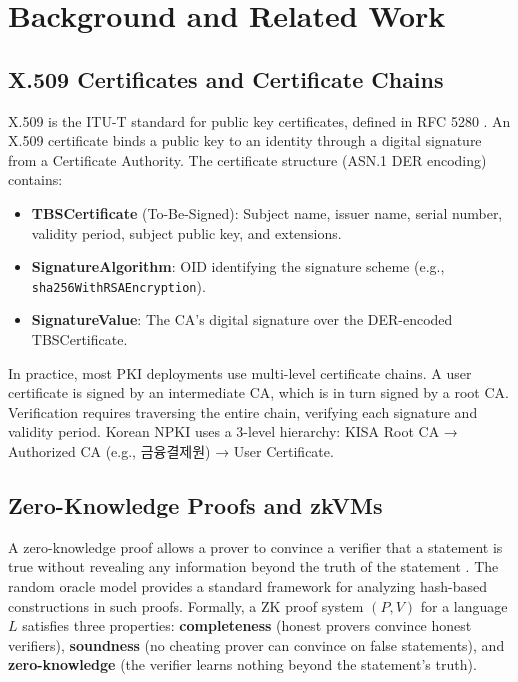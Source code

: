 \documentclass[11pt, a4paper]{article}
\providecommand{\tightlist}{%
  \setlength{\itemsep}{0pt}\setlength{\parskip}{0pt}}
\begin{document}
\section{Background and Related
Work}\label{background-and-related-work}

\subsection{X.509 Certificates and Certificate
Chains}\label{x.509-certificates-and-certificate-chains}

X.509 is the ITU-T standard for public key certificates, defined in RFC
5280 \cite{ref4}. An X.509 certificate binds a public key to an identity
through a digital signature from a Certificate Authority. The
certificate structure (ASN.1 DER encoding) contains:

\begin{itemize}
\tightlist
\item
  \textbf{TBSCertificate} (To-Be-Signed): Subject name, issuer name,
  serial number, validity period, subject public key, and extensions.
\item
  \textbf{SignatureAlgorithm}: OID identifying the signature scheme
  (e.g., \texttt{sha256WithRSAEncryption}).
\item
  \textbf{SignatureValue}: The CA's digital signature over the
  DER-encoded TBSCertificate.
\end{itemize}

In practice, most PKI deployments use multi-level certificate chains. A
user certificate is signed by an intermediate CA, which is in turn
signed by a root CA. Verification requires traversing the entire chain,
verifying each signature and validity period. Korean NPKI uses a 3-level
hierarchy: KISA Root CA → Authorized CA (e.g., 금융결제원) → User
Certificate.

\subsection{Zero-Knowledge Proofs and
zkVMs}\label{zero-knowledge-proofs-and-zkvms}

A zero-knowledge proof allows a prover to convince a verifier that a
statement is true without revealing any information beyond the truth of
the statement \cite{ref5}. The random oracle model \cite{ref15} provides a
standard framework for analyzing hash-based constructions in such
proofs. Formally, a ZK proof system \((P, V)\) for a language \(L\)
satisfies three properties: \textbf{completeness} (honest provers
convince honest verifiers), \textbf{soundness} (no cheating prover can
convince on false statements), and \textbf{zero-knowledge} (the verifier
learns nothing beyond the statement's truth).
\end{document}
